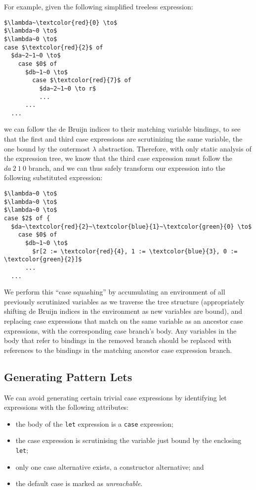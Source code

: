 
For example, given the following simplified treeless expression:

\begin{lstlisting}[style=math]
$\lambda~\textcolor{red}{0} \to$
$\lambda~0 \to$
$\lambda~0 \to$
case $\textcolor{red}{2}$ of
  $da~2~1~0 \to$
    case $0$ of
      $db~1~0 \to$
        case $\textcolor{red}{7}$ of
          $da~2~1~0 \to r$
          ...
      ...
  ...
\end{lstlisting}

we can follow the de Bruijn indices to their matching variable bindings, to see that the first and third case expressions are scrutinizing the same variable, the one bound by the outermost $\lambda$ abstraction. Therefore, with only static analysis of the expression tree, we know that the third case expression must follow the $da~2~1~0$ branch, and we can thus safely transform our expression into the following substituted expression:

\begin{lstlisting}[style=math]
$\lambda~0 \to$
$\lambda~0 \to$
$\lambda~0 \to$
case $2$ of {
  $da~\textcolor{red}{2}~\textcolor{blue}{1}~\textcolor{green}{0} \to$
    case $0$ of
      $db~1~0 \to$
        $r[2 := \textcolor{red}{4}, 1 := \textcolor{blue}{3}, 0 := \textcolor{green}{2}]$
      ...
  ...
\end{lstlisting}

We perform this ``case squashing'' by accumulating an environment of all previously scrutinized variables as we traverse the tree structure (appropriately shifting de Bruijn indices in the environment as new variables are bound), and replacing case expressions that match on the same variable as an ancestor case expressions, with the corresponding case branch's body. Any variables in the body that refer to bindings in the removed branch should be replaced with references to the bindings in the matching ancestor case expression branch.

\subsection{Generating Pattern Lets}
\label{sub:logical_plet}

We can avoid generating certain trivial case expressions by identifying let expressions with the following attributes:
\begin{itemize}
  \item the body of the \lstinline{let} expression is a \lstinline{case} expression;
  \item the case expression is scrutinising the variable just bound by the enclosing \lstinline{let};
  \item only one case alternative exists, a constructor alternative; and
  \item the default case is marked as \textit{unreachable}.
\end{itemize}

